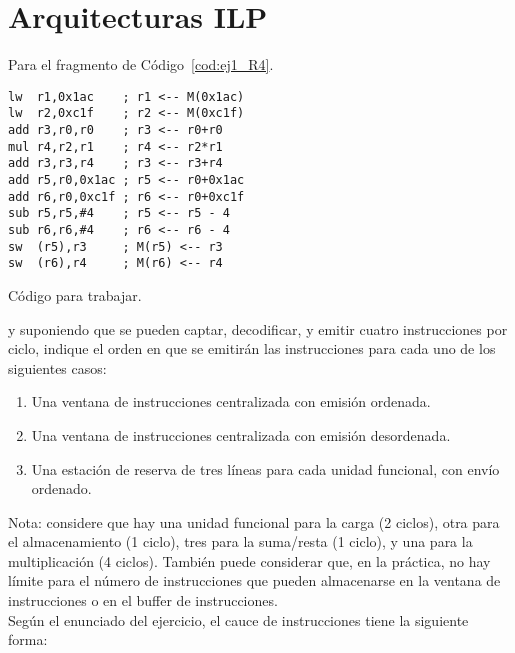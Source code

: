 \section{Arquitecturas ILP}

\begin{ejercicio}
    Para el fragmento de Código~\ref{cod:ej1_R4}.
    \begin{listing}[H]
    \begin{verbatim}
lw  r1,0x1ac    ; r1 <-- M(0x1ac)
lw  r2,0xc1f    ; r2 <-- M(0xc1f)
add r3,r0,r0    ; r3 <-- r0+r0
mul r4,r2,r1    ; r4 <-- r2*r1
add r3,r3,r4    ; r3 <-- r3+r4
add r5,r0,0x1ac ; r5 <-- r0+0x1ac
add r6,r0,0xc1f ; r6 <-- r0+0xc1f
sub r5,r5,#4    ; r5 <-- r5 - 4
sub r6,r6,#4    ; r6 <-- r6 - 4
sw  (r5),r3     ; M(r5) <-- r3
sw  (r6),r4     ; M(r6) <-- r4
    \end{verbatim}
    \caption{Código para trabajar.}
    \label{cod:ej1_R4}
\end{listing}
y suponiendo que se pueden captar, decodificar, y emitir cuatro instrucciones por ciclo, indique el orden en que se emitirán las instrucciones para cada uno de los siguientes casos:
\begin{enumerate}
    \item Una ventana de instrucciones centralizada con emisión ordenada.
    \item Una ventana de instrucciones centralizada con emisión desordenada.
    \item Una estación de reserva de tres líneas para cada unidad funcional, con envío ordenado.
\end{enumerate}

Nota: considere que hay una unidad funcional para la carga (2 ciclos), otra para el almacenamiento (1 ciclo), tres para la suma/resta (1 ciclo), y una para la multiplicación (4 ciclos). También puede considerar que, en la práctica, no hay límite para el número de instrucciones que pueden almacenarse en la ventana de instrucciones o en el buffer de instrucciones.\\

Según el enunciado del ejercicio, el cauce de instrucciones tiene la siguiente forma:

\begin{figure}[H]
\centering
{}
\end{figure}
\end{ejercicio}

